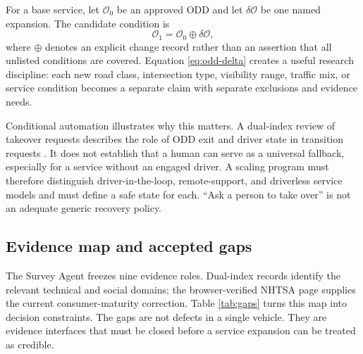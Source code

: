 \documentclass[conference]{../../../../Conference-LaTeX-template_10-17-19/IEEEtran}
\begin{document}
For a base service, let $\mathcal{O}_0$ be an approved ODD and let $\delta\mathcal{O}$ be one named expansion. The candidate condition is
\begin{equation}
\mathcal{O}_1=\mathcal{O}_0\oplus\delta\mathcal{O},
\label{eq:odd-delta}
\end{equation}
where $\oplus$ denotes an explicit change record rather than an assertion that all unlisted conditions are covered. Equation \eqref{eq:odd-delta} creates a useful research discipline: each new road class, intersection type, visibility range, traffic mix, or service condition becomes a separate claim with separate exclusions and evidence needs.

Conditional automation illustrates why this matters. A dual-index review of takeover requests describes the role of ODD exit and driver state in transition requests \cite{morales_alvarez_etal_2020}. It does not establish that a human can serve as a universal fallback, especially for a service without an engaged driver. A scaling program must therefore distinguish driver-in-the-loop, remote-support, and driverless service models and must define a safe state for each. ``Ask a person to take over'' is not an adequate generic recovery policy.

\subsection{Evidence map and accepted gaps}
The Survey Agent freezes nine evidence roles. Dual-index records identify the relevant technical and social domains; the browser-verified NHTSA page supplies the current consumer-maturity correction. Table \ref{tab:gaps} turns this map into decision constraints. The gaps are not defects in a single vehicle. They are evidence interfaces that must be closed before a service expansion can be treated as credible.
\end{document}
